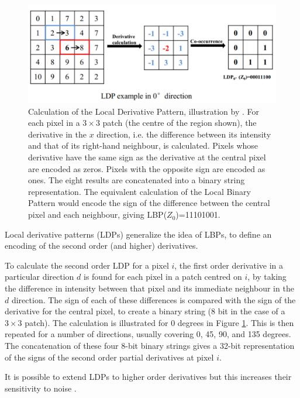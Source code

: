 \documentclass{report}
\begin{document}
\begin{figure}
\centering
\includegraphics[width=5.5in]{LDPexample_jiang.pdf}
\caption{Calculation of the Local Derivative Pattern, illustration by \cite{jiang2017fast}. For each pixel in a $3\times 3$ patch (the centre of the region shown), the derivative in the $x$ direction, i.e. the difference between its intensity and that of its right-hand neighbour, is calculated. Pixels whose derivative have the same sign as the derivative at the central pixel are encoded as zeros. Pixels with the opposite sign are encoded as ones. The eight results are concatenated into a binary string representation. The equivalent calculation of the Local Binary Pattern would encode the sign of the difference between the central pixel and each neighbour, giving LBP($Z_0$)=11101001.}
\label{fig:LDP}
\end{figure}

Local derivative patterns (LDPs) generalize the idea of LBPs, to define an encoding of the second order (and higher) derivatives. 

To calculate the second order LDP for a pixel $i$, the first order derivative in a particular direction $d$ is found for each pixel in a patch centred on $i$, by taking the difference in intensity between that pixel and its immediate neighbour in the $d$ direction. The sign of each of these differences is compared with the sign of the derivative for the central pixel, to create a binary string (8 bit in the case of a $3 \times 3$ patch). The calculation is illustrated for 0 degrees in Figure \ref{fig:LDP}. This is then repeated for a number of directions, usually covering 0, 45, 90, and 135 degrees. The concatenation of these four 8-bit binary strings gives a 32-bit representation of the signs of the second order partial derivatives at pixel $i$.

It is possible to extend LDPs to higher order derivatives but this increases their sensitivity to noise \citep{jiang2017fast}.
\end{document}
